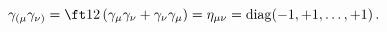 \begin{equation}
  \gamma _{(\mu} \gamma _{\nu)}=
  \ft12\left( \gamma _\mu \gamma _\nu +\gamma _\nu \gamma _\mu \right)
   =\eta _{\mu \nu }=\mathop{\rm diag}\nolimits (-1,+1,\ldots ,+1)\,.
 \label{defgamma}
\end{equation}

